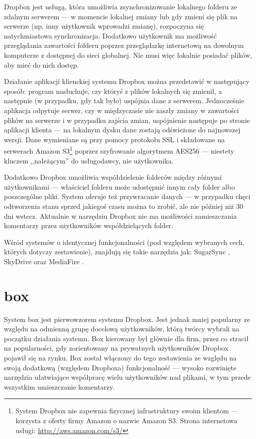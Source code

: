 \documentclass[polish,a4paper,twoside]{ppfcmthesis}
\begin{document}
Dropbox jest usługą, która umożliwia zsynchronizowanie lokalnego folderu ze zdalnym serwerem --- w momencie lokalnej zmiany lub gdy zmieni się plik na serwerze (np. inny użytkownik wprowadzi zmianę), rozpoczyna się natychmiastowa synchronizacja. Dodatkowo użytkownik ma możliwość przeglądania zawartości folderu poprzez przeglądarkę internetową na dowolnym komputerze z dostępnej do sieci globalnej. Nie musi więc lokalnie posiadać plików, aby mieć do nich dostęp.

Działanie aplikacji klienckiej systemu Dropbox można przedstawić w następujący sposób: program nasłuchuje, czy któryś z plików lokalnych się zmienił, a następnie (w przypadku, gdy tak było) uspójnia dane z serwerem. Jednocześnie aplikacja odpytuje serwer, czy w międzyczasie nie zaszły zmiany w zawartości plików na serwerze i w przypadku zajścia zmian, uspójnienie następuje po stronie aplikacji klienta --- na lokalnym dysku dane zostają odświeżone do najnowszej wersji. Dane wymieniane są przy pomocy protokołu SSL i składowane na serwerach Amazon S3\footnote{System Dropbox nie zapewnia fizycznej infrastruktury swoim klientom --- korzysta z oferty firmy Amazon o nazwie Amazon S3. Strona internetowa usługi: \url{http://aws.amazon.com/s3/}} poprzez szyfrowanie algorytmem AES256 \cite{aes} --- niestety kluczem ,,należącym'' do usługodawcy, nie użytkownika.

Dodatkowo Dropbox umożliwia współdzielenie folderów między różnymi użytkownikami --- właściciel folderu może udostępnić innym cały folder albo poszczególne pliki. System oferuje też przywracanie danych --- w przypadku chęci odtworzenia stanu sprzed jakiegoś czasu można to zrobić, ale nie później niż 30 dni wstecz. Aktualnie w narzędziu Dropbox nie ma możliwości zamieszczania komentarzy przez użytkowników współdzielących folder.

Wśród systemów o identycznej funkcjonalności (pod względem wybranych cech, których dotyczy zestawienie), znajdują się takie narzędzia jak: SugarSync \cite{sugarsync}, SkyDrive \cite{skydrive} oraz MediaFire \cite{mediafire}.

\section*{box}

System box \cite{box} jest pierwowzorem systemu Dropbox. Jest jednak mniej popularny ze względu na odmienną grupę docelową użytkowników, którą twórcy wybrali na początku działania systemu. Box kierowany był głównie dla firm, przez co stracił na popularności, gdy zorientowany na prywatnych użytkowników Dropbox pojawił się na rynku. Box został włączony do tego zestawienia ze względu na swoją dodatkową (względem Dropboxa) funkcjonalność --- wysoko rozwinięte narzędzia ułatwiające współpracę wielu użytkowników nad plikami, w tym przede wszystkim umieszczanie komentarzy.
\end{document}
